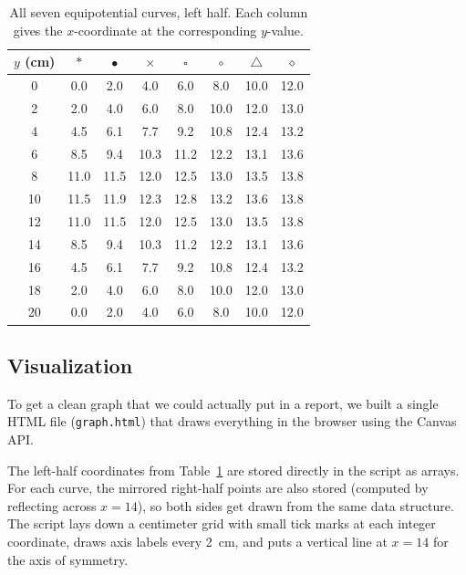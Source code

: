 \documentclass[12pt]{article}
\begin{document}
\begin{table}[H]
    \centering
    \caption{All seven equipotential curves, left half. Each column gives the $x$-coordinate at the corresponding $y$-value.}
    \label{tab:allcurves}
    \begin{tabular}{cccccccc}
        \toprule
        $y$ (cm) & $\ast$ & $\bullet$ & $\times$ & $\square$ & $\circ$ & $\triangle$ & $\diamond$ \\
        \midrule
        0  & 0.0  & 2.0  & 4.0  & 6.0  & 8.0  & 10.0 & 12.0 \\
        2  & 2.0  & 4.0  & 6.0  & 8.0  & 10.0 & 12.0 & 13.0 \\
        4  & 4.5  & 6.1  & 7.7  & 9.2  & 10.8 & 12.4 & 13.2 \\
        6  & 8.5  & 9.4  & 10.3 & 11.2 & 12.2 & 13.1 & 13.6 \\
        8  & 11.0 & 11.5 & 12.0 & 12.5 & 13.0 & 13.5 & 13.8 \\
        10 & 11.5 & 11.9 & 12.3 & 12.8 & 13.2 & 13.6 & 13.8 \\
        12 & 11.0 & 11.5 & 12.0 & 12.5 & 13.0 & 13.5 & 13.8 \\
        14 & 8.5  & 9.4  & 10.3 & 11.2 & 12.2 & 13.1 & 13.6 \\
        16 & 4.5  & 6.1  & 7.7  & 9.2  & 10.8 & 12.4 & 13.2 \\
        18 & 2.0  & 4.0  & 6.0  & 8.0  & 10.0 & 12.0 & 13.0 \\
        20 & 0.0  & 2.0  & 4.0  & 6.0  & 8.0  & 10.0 & 12.0 \\
        \bottomrule
    \end{tabular}
\end{table}

\subsection{Visualization}

To get a clean graph that we could actually put in a report, we built a single HTML file (\texttt{graph.html}) that draws everything in the browser using the Canvas API.

The left-half coordinates from Table~\ref{tab:allcurves} are stored directly in the script as arrays. For each curve, the mirrored right-half points are also stored (computed by reflecting across $x = 14$), so both sides get drawn from the same data structure. The script lays down a centimeter grid with small tick marks at each integer coordinate, draws axis labels every 2~cm, and puts a vertical line at $x = 14$ for the axis of symmetry.
\end{document}
